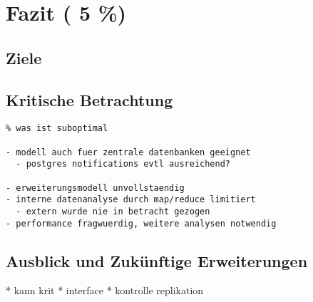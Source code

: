 \chapter{Fazit ( 5 \%)}
\section{Ziele}


\section{Kritische Betrachtung}
\begin{verbatim}
% was ist suboptimal

- modell auch fuer zentrale datenbanken geeignet
  - postgres notifications evtl ausreichend?

- erweiterungsmodell unvollstaendig
- interne datenanalyse durch map/reduce limitiert
  - extern wurde nie in betracht gezogen
- performance fragwuerdig, weitere analysen notwendig
\end{verbatim}




\section{Ausblick und Zukünftige Erweiterungen}

* kann krit
* interface
* kontrolle replikation

